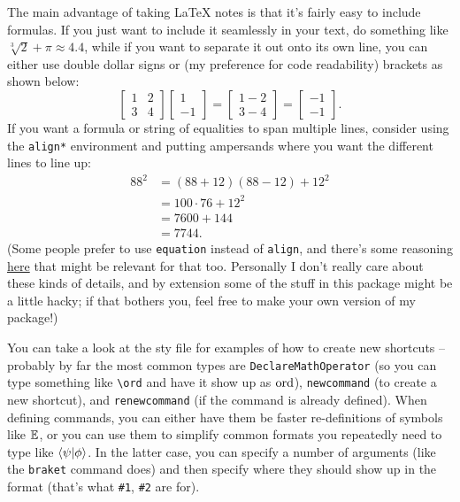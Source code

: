\documentclass[11pt]{article}
\begin{document}
The main advantage of taking LaTeX notes is that it's fairly easy to include formulas. If you just want to include it seamlessly in your text, do something like $\sqrt[3]{2} + \pi \approx 4.4$, while if you want to separate it out onto its own line, you can either use double dollar signs or (my preference for code readability) brackets as shown below:
\[
    \begin{bmatrix} 1 & 2 \\ 3 & 4 \end{bmatrix} \begin{bmatrix} 1 \\ -1 \end{bmatrix} = \begin{bmatrix} 1 - 2 \\ 3 - 4 \end{bmatrix} = \begin{bmatrix} -1 \\ -1 \end{bmatrix}.
\]
If you want a formula or string of equalities to span multiple lines, consider using the \texttt{align*} environment and putting ampersands where you want the different lines to line up:
\begin{align*}
88^2 &= (88 + 12)(88 - 12) + 12^2 \\
&= 100 \cdot 76 + 12^2 \\
&= 7600 + 144 \\
&= 7744.
\end{align*}
(Some people prefer to use \texttt{equation} instead of \texttt{align}, and there's some reasoning \href{https://tex.stackexchange.com/questions/321/align-vs-equation}{here} that might be relevant for that too. Personally I don't really care about these kinds of details, and by extension some of the stuff in this package might be a little hacky; if that bothers you, feel free to make your own version of my package!)

You can take a look at the sty file for examples of how to create new shortcuts -- probably by far the most common types are \texttt{DeclareMathOperator} (so you can type something like \texttt{\textbackslash ord} and have it show up as $\operatorname{ord}$), \texttt{newcommand} (to create a new shortcut), and \texttt{renewcommand} (if the command is already defined). When defining commands, you can either have them be faster re-definitions of symbols like $\mathbb E$, or you can use them to simplify common formats you repeatedly need to type like $\left\langle \psi\middle| \phi \right\rangle$. In the latter case, you can specify a number of arguments (like the \texttt{braket} command does) and then specify where they should show up in the format (that's what \texttt{\#1}, \texttt{\#2} are for). 
\end{document}
